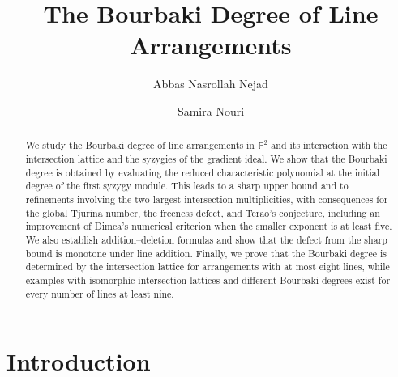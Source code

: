 \documentclass[11pt]{amsart}   %
\theoremstyle{definition}
\def\NZQ{\mathbb}               %
\def\PP{{\NZQ P}}
\begin{document}
		
		\title[ Bourbaki Degree of Line Arrangements]{The Bourbaki Degree of Line Arrangements} 
		
		\author{Abbas Nasrollah Nejad}
		\address{Department of Mathematics, Institute for Advanced Studies in Basic Sciences (IASBS), Zanjan 45137-66731, Iran \newline \indent
        Instituto de Ciência e Tecnologia, Universidade Federal de S\~ao Paulo (UNIFESP),
        S\~ao Jos\'e dos Campos, SP, Brazil
        }

        \author{Samira Nouri}
		\address{Department of Mathematics, Institute for Advanced Studies in Basic Sciences (IASBS), Zanjan 45137-66731, Iran }
		

\begin{abstract}
We study the Bourbaki degree of line arrangements in $\PP^2$ and its
interaction with the intersection lattice and the syzygies of the
gradient ideal. We show that the Bourbaki degree is obtained by
evaluating the reduced characteristic polynomial at the initial degree
of the first syzygy module. This leads to a sharp upper bound and to refinements involving the two
largest intersection multiplicities, with consequences for the global
Tjurina number, the freeness defect, and Terao's conjecture, including
an improvement of Dimca's numerical criterion when the smaller
exponent is at least five. We also establish addition--deletion formulas
and show that the defect from the sharp bound is monotone under line
addition. Finally, we prove that the Bourbaki degree is determined by
the intersection lattice for arrangements with at most eight lines, while examples with isomorphic intersection lattices and different
Bourbaki degrees exist for every number of lines at least nine.
\end{abstract}
		\maketitle
\section*{Introduction}
\label{sec:introduction}
\end{document}
